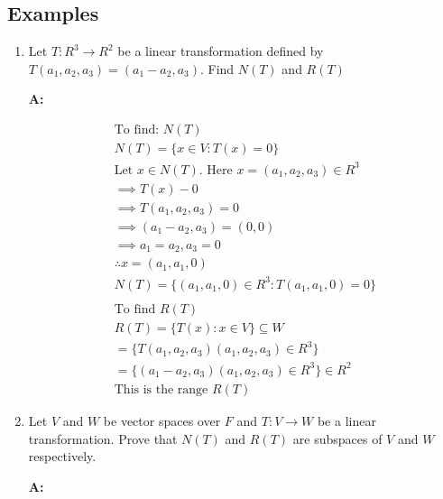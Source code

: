 \documentclass[english,course,fleqn]{lecture}
\newenvironment{qanda}{\begin{enumerate}\setlength{\parindent}{0pt}}{\medskip\end{enumerate}}
\newcommand{\Q}{\bigskip\bfseries \item}
\newcommand{\A}{\par\textbf{A:} \normalfont}
\begin{document}
\subsection*{Examples}

\begin{qanda}
  
  \Q Let $T: R^{3} \rightarrow R^{2}$ be a linear transformation defined by $T(a_{1}, a_{2}, a_{3}) = (a_{1} - a_{2}, a_{3})$.
  Find $N(T)$ and $R(T)$

  \A

  \begin{gather*}
    \text{To find: } N(T)\\
    N(T) = \{x \in V: T(x) = 0 \}\\
    \text{Let $x \in N(T)$. Here $x = (a_{1}, a_{2}, a_{3}) \in R^{3}$}\\
    \implies T(x) - 0\\
    \implies T(a_{1}, a_{2}, a_{3}) = 0\\
    \implies (a_{1} - a_{2}, a_{3}) = (0,0)\\
    \implies a_{1} = a_{2}, a_{3} = 0\\
    \therefore x = (a_{1}, a_{1}, 0)\\
    N(T) = \{(a_{1}, a_{1}, 0) \in R^{3}: T(a_{1}, a_{1}, 0) = 0 \}\\
    \\
    \text{To find $R(T)$}\\
    R(T) = \{T(x): x \in V \} \subseteq W\\
    = \{T(a_{1}, a_{2}, a_{3}) (a_{1}, a_{2}, a_{3}) \in R^{3}\}\\
    = \{(a_{1} - a_{2}, a_{3}) (a_{1}, a_{2}, a_{3}) \in R^{3}\}
    \in R^{2}\\
    \text{This is the range $R(T)$}
  \end{gather*}


  \Q Let $V$ and $W$ be vector spaces over $F$ and $T:V\rightarrow W$ be a linear transformation.
  Prove that $N(T)$ and $R(T)$ are subspaces of $V$ and $W$ respectively.

  \A


\end{qanda}
\end{document}
